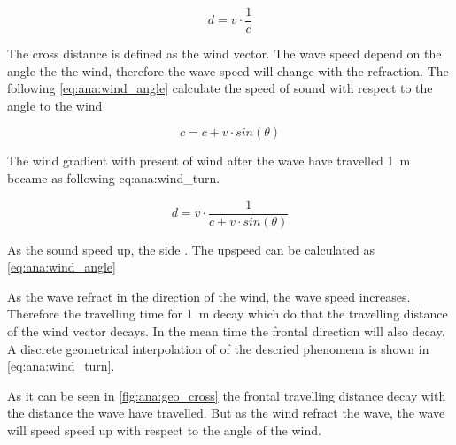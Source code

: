 \begin{equation}\label{eq:ana:wind_turn}
d = v \cdot \frac{1}{c}
\end{equation} 

\startexplain
{}
\stopexplain


The cross distance is defined as the wind vector. The wave speed depend on the angle the the wind, therefore the wave speed will change with the refraction. The following \autoref{eq:ana:wind_angle} calculate the speed of sound with respect to the angle to the wind 


\begin{equation}\label{eq:ana:wind_angle}
c = c+v \cdot sin(\theta)
\end{equation}

\startexplain
{}
\stopexplain

The wind gradient with present of wind after the wave have travelled \SI{1}{\meter} became as following {eq:ana:wind_turn}.

\begin{equation}\label{eq:ana:wind_turn}
d = v \cdot \frac{1}{c+v \cdot sin(\theta)}
\end{equation} 




As the sound speed up, the side .  The upspeed can be calculated as \autoref{eq:ana:wind_angle}


As the wave refract in the direction of the wind, the wave speed increases. Therefore the travelling time for \SI{1}{\meter} decay which do that the travelling distance of the wind vector decays. In the mean time the frontal direction will also decay.  A discrete geometrical interpolation of of the descried phenomena is shown in  \autoref{eq:ana:wind_turn}.



As it can be seen in \autoref{fig:ana:geo_cross} the frontal travelling distance decay with the distance the wave have travelled. But as the wind refract the wave, the wave will speed speed up with respect to the angle of the wind.

